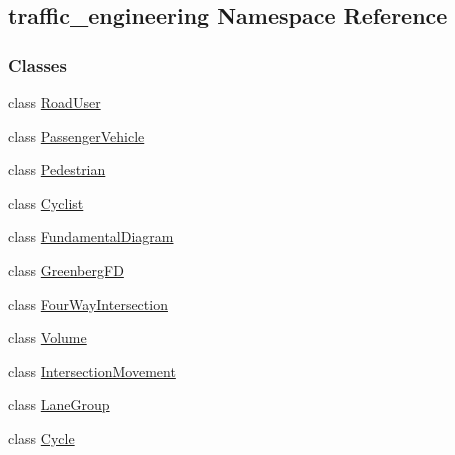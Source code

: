 \hypertarget{namespacetraffic__engineering}{\subsection{traffic\-\_\-engineering Namespace Reference}
\label{namespacetraffic__engineering}
}
\subsubsection*{Classes}
\begin{DoxyCompactItemize}
\item 
class \hyperlink{classtraffic__engineering_1_1RoadUser}{Road\-User}
\item 
class \hyperlink{classtraffic__engineering_1_1PassengerVehicle}{Passenger\-Vehicle}
\item 
class \hyperlink{classtraffic__engineering_1_1Pedestrian}{Pedestrian}
\item 
class \hyperlink{classtraffic__engineering_1_1Cyclist}{Cyclist}
\item 
class \hyperlink{classtraffic__engineering_1_1FundamentalDiagram}{Fundamental\-Diagram}
\item 
class \hyperlink{classtraffic__engineering_1_1GreenbergFD}{Greenberg\-F\-D}
\item 
class \hyperlink{classtraffic__engineering_1_1FourWayIntersection}{Four\-Way\-Intersection}
\item 
class \hyperlink{classtraffic__engineering_1_1Volume}{Volume}
\item 
class \hyperlink{classtraffic__engineering_1_1IntersectionMovement}{Intersection\-Movement}
\item 
class \hyperlink{classtraffic__engineering_1_1LaneGroup}{Lane\-Group}
\item 
class \hyperlink{classtraffic__engineering_1_1Cycle}{Cycle}
\end{DoxyCompactItemize}
